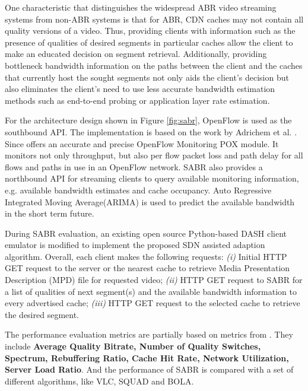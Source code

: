 \documentclass{article}
\begin{document}
One characteristic that distinguishes the widespread ABR video streaming systems from non-ABR systems is that for ABR, CDN caches may not contain all quality versions of a video. Thus, providing clients with information such as the presence of qualities of desired segments in particular caches allow the client to make an educated decision on segment retrieval. Additionally, providing bottleneck bandwidth information on the paths between the client and the caches that currently host the sought segments not only aids the client's decision but also eliminates the client's need to use less accurate bandwidth estimation methods such as end-to-end probing or application layer rate estimation. 

For the architecture design shown in Figure \ref{fig:sabr}, OpenFlow is used as the southbound API. The implementation is based on the work by Adrichem et al. \cite{openmon}. Since \cite{openmon} offers an accurate and precise OpenFlow Monitoring POX module. It monitors not only throughput, but also per flow packet loss and path delay for all flows and paths in use in an OpenFlow network. SABR also provides a northbound API for streaming clients to query available monitoring information, e.g. available bandwidth estimates and cache occupancy. Auto Regressive Integrated Moving Average(ARIMA) is used to predict the available bandwidth in the short term future. 

During SABR evaluation, an existing open source Python-based DASH client emulator is modified to implement the proposed SDN assisted adaption algorithm. Overall, each client makes the following requests: \textit{(i)} Initial HTTP GET request to the server or the nearest cache to retrieve Media Presentation Description (MPD) file for requested video; \textit{(ii)} HTTP GET request to SABR for a list of qualities of next segment(s) and the available bandwidth information to every advertised cache; \textit{(iii)} HTTP GET request to the selected cache to retrieve the desired segment.  

The performance evaluation metrics are partially based on metrics from \cite{zink05}. They include \textbf{Average Quality Bitrate, Number of Quality Switches, Spectrum, Rebuffering Ratio, Cache Hit Rate, Network Utilization, Server Load Ratio}. And the performance of SABR is compared with a set of different algorithms, like VLC, SQUAD and BOLA. 
\end{document}
